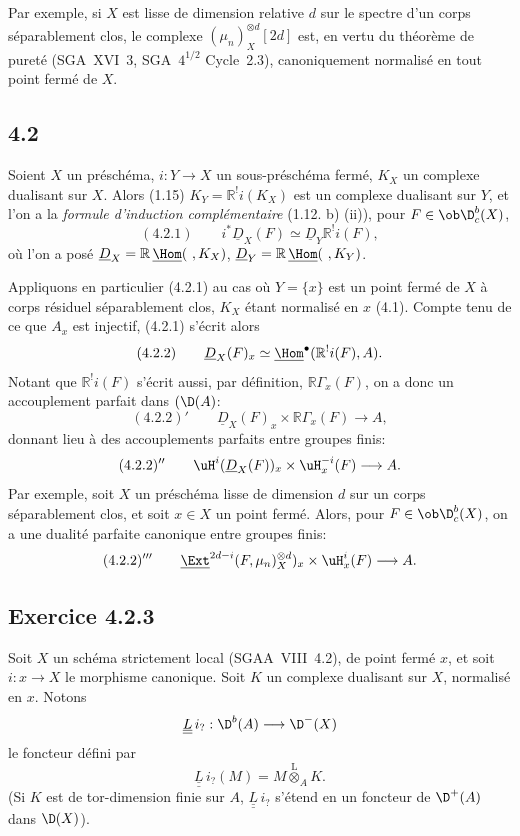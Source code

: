 Par
exemple, si $X$ est lisse de dimension relative $d$ sur le spectre d'un corps séparablement clos, le complexe $(\mu_n)_X^{\otimes d}[2d]$ est, en vertu du théorème de pureté (SGA~XVI~3, SGA~$4^{1/2}$ Cycle~2.3), canoniquement normalisé en tout point fermé de $X$.

\subsection*{4.2}
Soient $X$ un préschéma, $i:Y\to X$ un sous-préschéma fermé, $K_X$ un complexe dualisant sur $X$. Alors (1.15) $K_Y=\mathbb{R}^{!}i(K_X)$ est un complexe dualisant sur $Y$, et l'on a la \emph{formule d'induction complémentaire} (1.12. b) (ii)), pour $F\in \ob\D_c^b(X)$,
\[
(4.2.1)\qquad i^*\underline{D}_X(F)\simeq\underline{D}_Y\mathbb{R}^{!}i(F),
\]
où l'on a posé $\underline{D}_X=\mathbb{R}\,\underline{\Hom}(\ ,K_X)$, $\underline{D}_Y=\mathbb{R}\,\underline{\Hom}(\ ,K_Y)$.

Appliquons en particulier (4.2.1) au cas où $Y=\{x\}$ est un point fermé de $X$ à corps résiduel séparablement clos, $K_X$ étant normalisé en $x$ (4.1). Compte tenu de ce que $A_x$ est injectif, (4.2.1) s'écrit alors
\[
(4.2.2)\qquad \underline{D}_X(F)_x\simeq\underline{\Hom}^{\bullet}(\mathbb{R}^{!}i(F),A).
\]
Notant que $\mathbb{R}^{!}i(F)$ s'écrit aussi, par définition, $\mathbb{R}\Gamma_x(F)$, on a donc un accouplement parfait dans $(\D(A)$:
\[
(4.2.2)'\qquad \underline{D}_X(F)_x\times \mathbb{R}\Gamma_x(F)\longrightarrow A,
\]
donnant lieu à des accouplements parfaits entre groupes finis:
\[
(4.2.2)''\qquad \uH^i(\underline{D}_X(F))_x\times \uH_x^{-i}(F)\longrightarrow A.
\]
Par exemple, soit $X$ un préschéma lisse de dimension $d$ sur un corps séparablement clos, et soit $x\in X$ un point fermé. Alors, pour $F\in\ob\D_c^b(X)$, on a une dualité parfaite canonique entre groupes finis:
\[
(4.2.2)'''\qquad \underline{\Ext}^{2d-i}(F,\mu_n)_X^{\otimes d})_x\times \uH_x^i(F)\longrightarrow A.
\]

\subsection*{Exercice 4.2.3}
Soit $X$ un schéma strictement local (SGAA~VIII~4.2), de point fermé $x$, et soit $i:x\to X$ le morphisme canonique. Soit $K$ un complexe dualisant sur $X$, normalisé en $x$. Notons
\[
\underline{\underline{L}}\, i_? : \D^b(A)\longrightarrow \D^-(X)
\]
le foncteur défini par
\[
\underline{\underline{L}}\, i_?(M)=M\overset{\mathrm{L}}{\otimes}_A K.
\]
(Si $K$ est de tor-dimension finie sur $A$, $\underline{\underline{L}}\, i_?$ s'étend en un foncteur de $\D^+(A)$ dans $\D(X)$).

